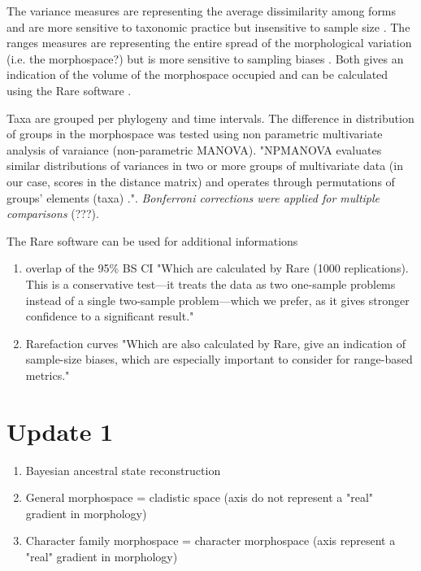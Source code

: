 \documentclass[a4paper,11pt]{article}
\begin{document}
The variance measures are representing the average dissimilarity among forms and are more sensitive to taxonomic practice but insensitive to sample size \citep{BIJ:BIJ45}.
The ranges measures are representing the entire spread of the morphological variation (i.e. the morphospace?) but is more sensitive to sampling biases \citep{BIJ:BIJ455}.
Both gives an indication of the volume of the morphospace occupied and can be calculated using the Rare software \citep{BIJ:BIJ455}.

Taxa are grouped per phylogeny and time intervals.
The difference in distribution of groups in the morphospace was tested using non parametric multivariate analysis of varaiance (non-parametric MANOVA).
"NPMANOVA evaluates similar distributions of variances in two or more groups of multivariate data (in our case, scores in the distance matrix) and operates through permutations of groups’ elements (taxa) \citep{AEC:AEC1070}."\citep{Brusatte12092008}.
\textit{Bonferroni corrections were applied for multiple comparisons} (???).

The Rare software \citep{BIJ:BIJ455} can be used for additional informations
\begin{enumerate}
\item{overlap of the 95\% BS CI}
"Which are calculated by Rare (1000 replications). This is a conservative test—it treats the data as two one-sample problems instead of a single two-sample problem—which we prefer, as it gives stronger confidence to a significant result." \citep{Brusatte12092008}
\item{Rarefaction curves}
"Which are also calculated by Rare, give an indication of sample-size biases, which are especially important to consider for range-based metrics."\citep{Brusatte12092008}
\end{enumerate}



\section{Update 1}
\begin{enumerate}
\item{Bayesian ancestral state reconstruction}
\item{General morphospace = cladistic space (axis do not represent a "real" gradient in morphology)}
\item{Character family morphospace = character morphospace (axis represent a "real" gradient in morphology)}
\end{enumerate}




\end{document}
